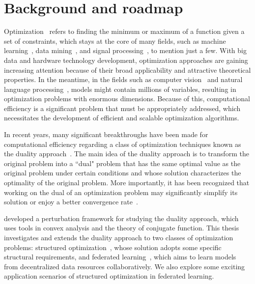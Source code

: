 \chapter{Background and roadmap}
\label{ch:Introduction}

Optimization~\citep{bert:1999} refers to finding the minimum or maximum of a function given a set of constraints, which stays at the core of many fields, such as machine learning~\citep{sra2012optimization,Bubeck15}, data mining~\citep{shi2011optimization}, and signal processing~\citep{mattingley2010real,palomar2010convex}, to mention just a few. With big data and hardware technology development, optimization approaches are gaining increasing attention because of their broad applicability and attractive theoretical properties. In the meantime, in the fields such as computer vision~\citep{krizhevsky2012imagenet} and natural language processing~\citep{wolf2020transformers}, models might contain millions of variables, resulting in optimization problems with enormous dimensions. Because of this, computational efficiency is a significant problem that must be appropriately addressed, which necessitates the development of efficient and scalable optimization algorithms. 

In recent years, many significant breakthroughs have been made for computational efficiency regarding a class of optimization techniques known as the duality approach~\citep{combettes2011proximal,shalev2013stochastic,jaggi2014communication}. The main idea of the duality approach is to transform the original problem into a ``dual" problem that has the same optimal value as the original problem under certain conditions and whose solution characterizes the optimality of the original problem. More importantly, it has been recognized that working on the dual of an optimization problem may significantly simplify its solution or enjoy a better convergence rate~\citep{komodakis2015playing}. 

\citet{rockafellar1970convex} developed a perturbation framework for studying the duality approach, which uses tools in convex analysis and the theory of conjugate function. This thesis investigates and extends the duality approach to two classes of optimization problems: structured optimization~\citep{bach2012optimization,chandrasekaran2012convex}, whose solution adopts some specific structural requirements, and federated learning~\citep{wang2021field}, which aims to learn models from decentralized data resources collaboratively. We also explore some exciting application scenarios of structured optimization in federated learning. 

